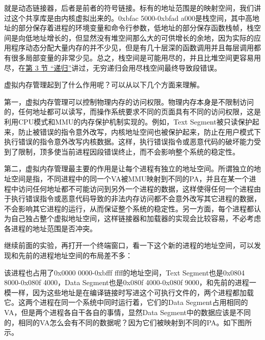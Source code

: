 就是动态链接器，后者是前者的符号链接。标有的地址范围是的映射空间，我们讲过这个共享库是由内核虚拟出来的。0xbfac 5000-0xbfad a000是栈空间，其中高地址的部分保存着进程的环境变量和命令行参数，低地址的部分保存函数栈帧，栈空间是向低地址增长的，但显然没有堆空间那么大的可供增长的余地，因为实际的应用程序动态分配大量内存的并不少见，但是有几十层深的函数调用并且每层调用都有很多局部变量的非常少见。总之，栈空间是可能用尽的，并且比堆空间更容易用尽，在\hyperlink{db.ch05s03.id2722951}{第 3 节 “递归”}讲过，无穷递归会用尽栈空间最终导致段错误。



虚拟内存管理起到了什么作用呢？可以从以下几个方面来理解。



第一，虚拟内存管理可以控制物理内存的访问权限。物理内存本身是不限制访问的，任何地址都可以读写，而操作系统要求不同的页面具有不同的访问权限，这是利用CPU模式和MMU的内存保护机制实现的。例如，Text Segment被只读保护起来，防止被错误的指令意外改写，内核地址空间也被保护起来，防止在用户模式下执行错误的指令意外改写内核数据。这样，执行错误指令或恶意代码的破坏能力受到了限制，顶多使当前进程因段错误终止，而不会影响整个系统的稳定性。



第二，虚拟内存管理最主要的作用是让每个进程有独立的地址空间。所谓独立的地址空间是指，不同进程中的同一个VA被MMU映射到不同的PA，并且在某一个进程中访问任何地址都不可能访问到另外一个进程的数据，这样使得任何一个进程由于执行错误指令或恶意代码导致的非法内存访问都不会意外改写其它进程的数据，不会影响其它进程的运行，从而保证整个系统的稳定性。另一方面，每个进程都认为自己独占整个虚拟地址空间，这样链接器和加载器的实现会比较容易，不必考虑各进程的地址范围是否冲突。



继续前面的实验，再打开一个终端窗口，看一下这个新的进程的地址空间，可以发现和先前的进程地址空间的布局差不多：




该进程也占用了0x0000 0000-0xbfff ffff的地址空间，Text Segment也是0x0804 8000-0x080f 4000，Data Segment也是0x080f 4000-0x080f 9000，和先前的进程一模一样，因为这些地址是在编译链接时写进这个可执行文件的，两个进程都加载它。这两个进程在同一个系统中同时运行着，它们的Data Segment占用相同的VA，但是两个进程各自干各自的事情，显然Data Segment中的数据应该是不同的，相同的VA怎么会有不同的数据呢？因为它们被映射到不同的PA。如下图所示。


